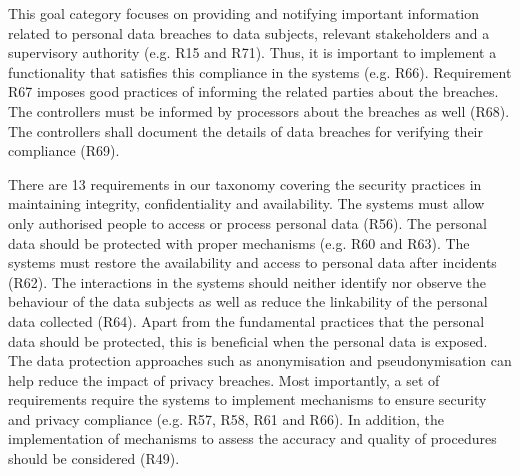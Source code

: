 This goal category focuses on providing and notifying important information related to personal data breaches to data subjects, relevant stakeholders and a supervisory authority (e.g. R15 and R71). Thus, it is important to implement a functionality that satisfies this compliance in the systems (e.g. R66). Requirement R67 imposes good practices of informing the related parties about the breaches. The controllers must be informed by processors about the breaches as well (R68). The controllers shall document the details of data breaches for verifying their compliance (R69).


There are 13 requirements in our taxonomy covering the security practices in maintaining integrity, confidentiality and availability. The systems must allow only authorised people to access or process personal data (R56). The personal data should be protected with proper mechanisms (e.g. R60 and R63). The systems must restore the availability and access to personal data after incidents (R62). The interactions in the systems should neither identify nor observe the behaviour of the data subjects as well as reduce the linkability of the personal data collected (R64). Apart from the fundamental practices that the personal data should be protected, this is beneficial when the personal data is exposed. The data protection approaches such as anonymisation and pseudonymisation can help reduce the impact of privacy breaches. Most importantly, a set of requirements require the systems to implement mechanisms to ensure security and privacy compliance (e.g. R57, R58, R61 and R66). In addition, the implementation of mechanisms to assess the accuracy and quality of procedures should be considered (R49). 

